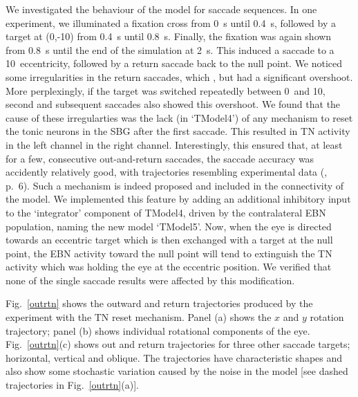 \documentclass{frontiersSCNS}
\begin{document}
We investigated the behaviour of the model for saccade sequences.  In
one experiment, we illuminated a fixation cross from 0~s until 0.4~s,
followed by a target at (0,-10\dg) from 0.4~s until 0.8~s. Finally,
the fixation was again shown from 0.8~s until the end of the
simulation at 2~s. This induced a saccade to a 10\dg~eccentricity,
followed by a return saccade back to the null point. We noticed some
irregularities in the return saccades, which , but had a significant overshoot.  More perplexingly, if the
target was switched repeatedly between 0\dg~and 10\dg, second and
subsequent  saccades also showed this overshoot. We found
that the cause of these irregularties was the lack (in `TModel4') of
any mechanism to reset the tonic neurons in the SBG after the first
saccade. This resulted in TN activity in the left channel 
in the right channel. Interestingly, this ensured that, at least for a
few, consecutive out-and-return saccades, the saccade accuracy was
accidently relatively good, with trajectories resembling experimental data
(\cite{bahill_trajectories_1979}, p.~6).  Such a mechanism
is indeed proposed and included in the connectivity of the
\cite{gancarz_neural_1998} model. We implemented this feature by adding an
additional inhibitory input to the `integrator' component of TModel4,
driven by the contralateral EBN population, naming the new model
`TModel5'.  Now, when the eye is directed towards an eccentric target
which is then exchanged with a target at the null point, the EBN
activity toward the null point will tend to extinguish the TN activity
which was holding the eye at the eccentric position.  We verified that
none of the single saccade results were affected by this modification.

Fig.~\ref{outrtn} shows the outward and return trajectories produced
by the experiment with the TN reset mechanism. Panel (a) shows the $x$
and $y$ rotation trajectory; panel (b) shows individual rotational
components of the eye. Fig.~\ref{outrtn}(c) shows out and return
trajectories for three other saccade targets; horizontal, vertical and
oblique. The trajectories have characteristic shapes and also show
some stochastic variation caused by the noise in the model [see dashed
trajectories in Fig.~\ref{outrtn}(a)].
\end{document}
